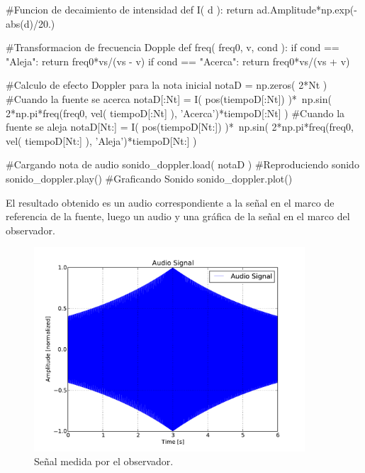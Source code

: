 \begin{listing}[style=python]
#Funcion de decaimiento de intensidad
def I( d ):
    return ad.Amplitude*np.exp(-abs(d)/20.)
    
#Transformacion de frecuencia Dopple
def freq( freq0, v, cond ):
    if cond == "Aleja":
	return freq0*vs/(vs - v)
    if cond == "Acerca":
	return freq0*vs/(vs + v)

#Calculo de efecto Doppler para la nota inicial
notaD = np.zeros( 2*Nt )
#Cuando la fuente se acerca
notaD[:Nt] = I( pos(tiempoD[:Nt]) )*\
np.sin( 2*np.pi*freq(freq0, vel( tiempoD[:Nt] ), 'Acerca')*tiempoD[:Nt] )
#Cuando la fuente se aleja
notaD[Nt:] = I( pos(tiempoD[Nt:]) )*\
np.sin( 2*np.pi*freq(freq0, vel( tiempoD[Nt:] ), 'Aleja')*tiempoD[Nt:] )

#Cargando nota de audio
sonido_doppler.load( notaD )
#Reproduciendo sonido
sonido_doppler.play()
#Graficando Sonido
sonido_doppler.plot()
\end{listing}

El resultado obtenido es un audio correspondiente a la señal en el marco de
referencia de la fuente, luego un audio y una gráfica de la señal en el 
marco del observador.


\begin{figure}[htbp]
	\centering
	\includegraphics[width=0.90\textwidth]
	{./pictures/demo3_02.pdf}

	\caption{\small{Señal medida por el observador.}}
	
	\label{fig:doppler_audio}
\end{figure}


